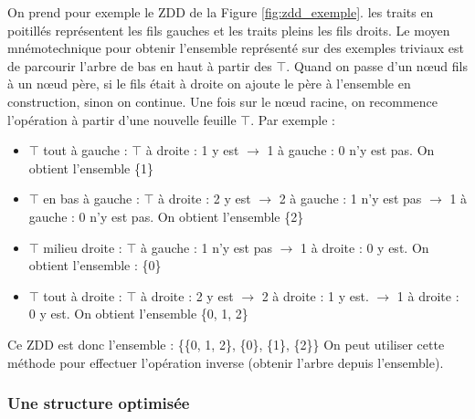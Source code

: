 \documentclass[a4paper]{article}
\begin{document}
On prend pour exemple le ZDD de la Figure \ref{fig:zdd_exemple}. les traits en 
poitillés représentent les fils gauches et les traits pleins les fils droits.
Le moyen mnémotechnique pour obtenir l'ensemble représenté sur des 
exemples triviaux est de parcourir 
l'arbre de bas en haut à partir des $\top$. Quand on passe d'un n\oe ud fils à un n\oe ud père, si le fils était à droite
on ajoute le père à l'ensemble en construction, sinon on continue. 
Une fois sur le n\oe ud racine,
on recommence l'opération à partir d'une nouvelle feuille $\top$. Par exemple :

\begin{itemize}
\item $\top$ tout à gauche : $\top$ à droite : 1 y est 
$\rightarrow$ 1 à gauche : 0 n'y est pas.
On obtient l'ensemble \{1\}
\item $\top$ en bas à gauche : $\top$ à droite : 2 y est $\rightarrow$  
2 à gauche : 1 n'y est pas $\rightarrow$ 
1 à gauche : 0 n'y est pas. On obtient l'ensemble \{2\}
\item $\top$ milieu droite : $\top$ à gauche : 1 n'y est pas $\rightarrow$
1 à droite : 0 y est.
On obtient l'ensemble : \{0\}
\item $\top$ tout à droite : $\top$ à droite : 2 y est $\rightarrow$ 
2 à droite : 1 y est. $\rightarrow$ 
1 à droite : 0 y est. On obtient l'ensemble \{0, 1, 2\}
\end{itemize}

Ce ZDD est donc l'ensemble : \{\{0, 1, 2\}, \{0\}, \{1\}, \{2\}\}
On peut utiliser cette méthode pour effectuer l'opération inverse (obtenir
l'arbre depuis l'ensemble).


\subsubsection{Une structure optimisée}
\end{document}
